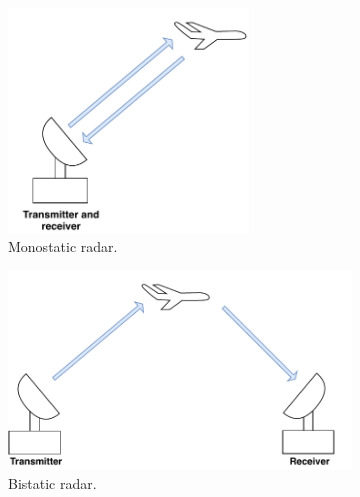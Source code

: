 \documentclass[english, 12pt, a4paper, elec, utf8, a-1b, online]{aaltothesis}
\begin{document}
\begin{figure}[htb]
    \centering
    \begin{subfigure}[b]{0.45\textwidth}
        \includegraphics[width=0.7\textwidth]{figures/background/radar_types_monostatic.pdf}
        \caption{Monostatic radar.}
        \label{fig:monostatic_radar}
    \end{subfigure}
    \hfill
    \begin{subfigure}[b]{0.45\textwidth}
        \includegraphics[width=\textwidth]{figures/background/radar_types_bistatic.pdf}
        \caption{Bistatic radar.}
        \label{fig:bistatic_radar}
    \end{subfigure}
    \hfill
    \begin{subfigure}[b]{0.45\textwidth}

\end{subfigure}
\end{figure}
\end{document}
